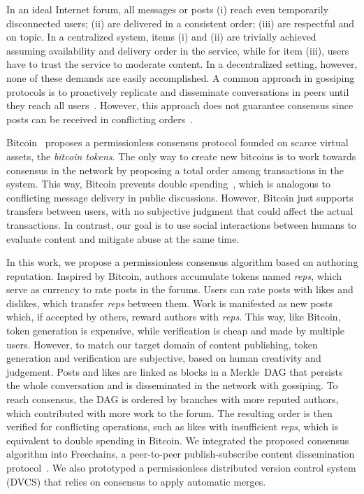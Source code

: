 \documentclass[10pt,journal,compsoc]{IEEEtran}
\newcommand{\FC}       {Freechains\xspace}
\newcommand{\reps}     {\emph{reps}\xspace}
\begin{document}
In an ideal Internet forum, all messages or posts
(i)   reach even temporarily disconnected users;
(ii)  are delivered in a consistent order;
(iii) are respectful and on topic.
In a centralized system, items (i) and (ii) are trivially achieved assuming
availability and delivery order in the service, while for item (iii), users
have to trust the service to moderate content.
In a decentralized setting, however, none of these demands are easily
accomplished.
A common approach in gossiping protocols is to proactively replicate and
disseminate conversations in peers until they reach all
users~\cite{p2p.survey}.
However, this approach does not guarantee consensus since posts can be received
in conflicting orders~\cite{p2p.intention}.

Bitcoin~\cite{p2p.bitcoin} proposes a permissionless consensus protocol founded
on scarce virtual assets, the \emph{bitcoin tokens}.
%
The only way to create new bitcoins is to work towards consensus in the network
by proposing a total order among transactions in the system.
%
This way, Bitcoin prevents double spending~\cite{p2p.bitcoin}, which is
analogous to conflicting message delivery in public discussions.
%
However, Bitcoin just supports transfers between users, with no subjective
judgment that could affect the actual transactions.
In contrast, our goal is to use social interactions between humans to evaluate
content and mitigate abuse at the same time.

In this work, we propose a permissionless consensus algorithm based on
authoring reputation.
Inspired by Bitcoin, authors accumulate tokens named \reps, which serve as
currency to rate posts in the forums.
Users can rate posts with likes and dislikes, which transfer \reps between
them.
Work is manifested as new posts which, if accepted by others, reward authors
with \reps.
This way, like Bitcoin, token generation is expensive, while verification is
cheap and made by multiple users.
However, to match our target domain of content publishing, token generation and
verification are subjective, based on human creativity and judgement.
Posts and likes are linked as blocks in a Merkle~DAG that persists the whole
conversation and is disseminated in the network with gossiping.
To reach consensus, the DAG is ordered by branches with more reputed authors,
which contributed with more work to the forum.
The resulting order is then verified for conflicting operations, such as likes
with insufficient \reps, which is equivalent to double spending in Bitcoin.
%
We integrated the proposed consensus algorithm into \FC, a peer-to-peer
publish-subscribe content dissemination protocol~\cite{fcs.sbseg20}.
We also prototyped a permissionless distributed version control system (DVCS)
that relies on consensus to apply automatic merges.
\end{document}
